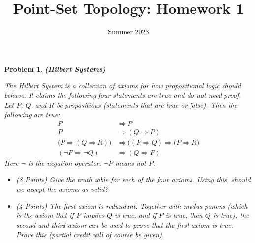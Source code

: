 \documentclass{article}
\title{Point-Set Topology: Homework 1}
\date{Summer 2023}
\theoremstyle{normal}
\newtheorem{problem}{Problem}
\begin{document}
    \maketitle
    \color{blue}
    \begin{problem}
        \textbf{(Hilbert Systems)}
        \par\hfill\par
        The Hilbert System is a collection of axioms for how propositional
        logic should behave. It claims the following four statements are true
        and do not need proof. Let $P$, $Q$, and $R$ be propositions
        (statements that are true or false). Then the following are true:
        \begin{align}
            P&\Rightarrow{P}\\
            P&\Rightarrow(Q\Rightarrow{P})\\
            \big(P\Rightarrow(Q\Rightarrow{R})\big)
            &\Rightarrow\big((P\Rightarrow{Q})\Rightarrow(P\Rightarrow{R}\big)\\
            (\neg{P}\Rightarrow\neg{Q})&\Rightarrow(Q\Rightarrow{P})
        \end{align}
        Here $\neg$ is the negation operator. $\neg{P}$ means \textit{not} $P$.
        \begin{itemize}
            \item (8 Points) Give the truth table for each of the four axioms.
                Using this, should we accept the axioms as valid?
            \item (4 Points) The first axiom is redundant. Together with
                \textit{modus ponens} (which is the axiom that if $P$ implies
                $Q$ is true, and if $P$ is true, then $Q$ is true), the second
                and third axiom can be used to prove that the first axiom is
                true. Prove this (partial credit will of course be given).
        \end{itemize}
    \end{problem}
    \color{black}
\end{document}

